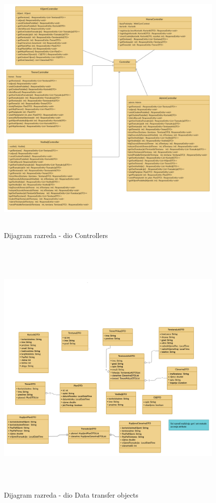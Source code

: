 		\begin{figure}[H]
			\includegraphics[height= 13cm,width=1.2\textwidth]{dijagrami/ControllerClass.jpg}
			\centering
			\caption{Dijagram razreda - dio Controllers}
			\label{fig:promjene}
		\end{figure}
		\begin{figure}[H]
			\includegraphics[height= 13cm,width=1.2\textwidth]{dijagrami/DTOClass.png}
			\centering
			\caption{Dijagram razreda - dio Data transfer objects}
			\label{fig:promjene}
		\end{figure}
